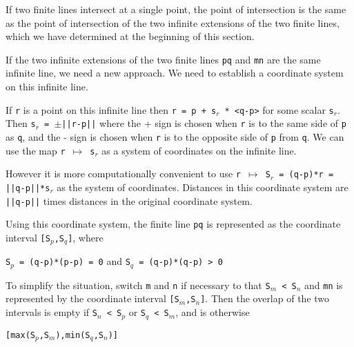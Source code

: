 \documentclass[12pt]{article}
\begin{document}
If two finite lines intersect at a single point, the point of intersection
is the same as the point of intersection of the two infinite extensions
of the two finite lines, which we have determined at the beginning
of this section.

If the two infinite extensions of the two finite lines {\tt pq} and
{\tt mn} are the same
infinite line, we need a new approach.  We need to establish a coordinate
system on this infinite line.

If {\tt r} is a point on this infinite line then
{\tt r = p + s$_r$ * <q-p>} for some scalar {\tt s$_r$}.  Then
{\tt s$_r$ = $\pm$||r-p||} where the + sign is chosen when {\tt r}
is to the same side of {\tt p} as {\tt q}, and the - sign is chosen
when {\tt r} is to the opposite side of {\tt p} from {\tt q}.
We can use the map {\tt r $\mapsto$ s$_r$} as a system of coordinates
on the infinite line.

However it is more computationally convenient to use
{\tt r $\mapsto$ S$_r$ = (q-p)*r = ||q-p||*s$_r$} as the system of coordinates.
Distances in this coordinate system are {\tt ||q-p||} times distances in the
original coordinate system.

Using this coordinate system, the finite line {\tt pq} is represented
as the coordinate interval {\tt [S$_p$,S$_q$]}, where \\
\centerline{{\tt S$_p$ = (q-p)*(p-p) = 0} and {\tt S$_q$ = (q-p)*(q-p) > 0 }}
To simplify
the situation, switch {\tt m} and {\tt n} if necessary to that
{\tt S$_m$ < S$_n$} and {\tt mn} is represented by the coordinate
interval {\tt [S$_m$,S$_n$]}.  Then the overlap of the two intervals
is empty if {\tt S$_n$ < S$_p$} or {\tt S$_q$ < S$_m$}, and is
otherwise \\
\centerline{\tt [max(S$_p$,S$_m$),min(S$_q$,S$_n$)]}
\end{document}
